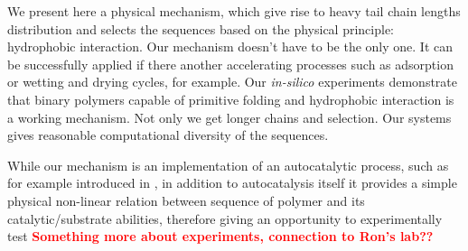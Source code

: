 \documentclass[journal=jacsat,manuscript=article,layout=twocolumn]{achemso}
\newcommand*{\red}[1]{\textcolor{red}{#1}}
\begin{document}
 We present here a physical mechanism, which give rise to 
heavy tail chain lengths distribution and selects the sequences based on the physical principle: 
hydrophobic interaction. Our mechanism doesn't have to be the only one. It can be successfully 
applied if there another accelerating processes such as adsorption or wetting and drying cycles, 
for example.
Our \textit{in-silico} experiments demonstrate that binary polymers 
capable of primitive folding and hydrophobic interaction is a working mechanism. Not only we get 
longer chains and selection. Our systems gives reasonable computational diversity of the sequences.

While our mechanism is an implementation of an autocatalytic process, such as for example 
introduced in \cite{Kauffman1986}, in addition to autocatalysis itself it provides a simple 
physical non-linear relation between sequence of polymer and its catalytic/substrate abilities, 
therefore giving an opportunity to experimentally test \red{\textbf{Something more about 
experiments, connection to Ron's lab??}}

   
\end{document}
